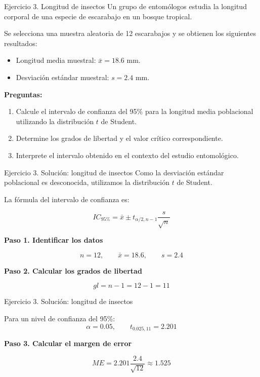 \documentclass[aspectratio=169,11pt]{beamer}
\begin{document}
\begin{frame}{Ejercicio 3. Longitud de insectos}
Un grupo de entomólogos estudia la longitud corporal de una
especie de escarabajo en un bosque tropical.

Se selecciona una muestra aleatoria de 12 escarabajos y se
obtienen los siguientes resultados:

\begin{itemize}
    \item Longitud media muestral: $\bar{x}=18.6$ mm.
    \item Desviación estándar muestral: $s=2.4$ mm.
\end{itemize}

\medskip
\textbf{Preguntas:}
\begin{enumerate}
    \item Calcule el intervalo de confianza del 95\% para
    la longitud media poblacional utilizando la distribución
    $t$ de Student.
    \item Determine los grados de libertad y el valor crítico
    correspondiente.
    \item Interprete el intervalo obtenido en el contexto
    del estudio entomológico.
\end{enumerate}
\end{frame}

\begin{frame}{Ejercicio 3. Solución: longitud de insectos}
Como la desviación estándar poblacional es desconocida,
utilizamos la distribución $t$ de Student.

La fórmula del intervalo de confianza es:

\[
IC_{95\%}=\bar{x}\pm t_{\alpha/2,n-1}
\frac{s}{\sqrt{n}}
\]

\textbf{Paso 1. Identificar los datos}

\[
n=12,\qquad \bar{x}=18.6,\qquad s=2.4
\]

\textbf{Paso 2. Calcular los grados de libertad}

\[
gl=n-1=12-1=11
\]
\end{frame}

\begin{frame}{Ejercicio 3. Solución: longitud de insectos}

Para un nivel de confianza del 95\%:
\[
\alpha=0.05,\qquad t_{0.025,11}=2.201
\]

\textbf{Paso 3. Calcular el margen de error}

\[
ME=2.201\frac{2.4}{\sqrt{12}}\approx1.525
\]

\end{frame}
\end{document}
